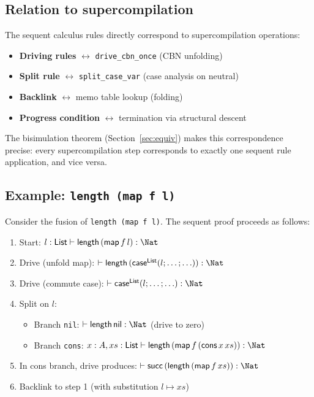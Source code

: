 \subsection{Relation to supercompilation}

The sequent calculus rules directly correspond to supercompilation operations:
\begin{itemize}
\item \textbf{Driving rules} $\leftrightarrow$ \texttt{drive\_cbn\_once} (CBN unfolding)
\item \textbf{Split rule} $\leftrightarrow$ \texttt{split\_case\_var} (case analysis on neutral)
\item \textbf{Backlink} $\leftrightarrow$ memo table lookup (folding)
\item \textbf{Progress condition} $\leftrightarrow$ termination via structural descent
\end{itemize}

\noindent The bisimulation theorem (Section~\ref{sec:equiv}) makes this correspondence precise: every supercompilation step corresponds to exactly one sequent rule application, and vice versa.

\subsection{Example: \texttt{length (map f l)}}

Consider the fusion of \texttt{length (map f l)}. The sequent proof proceeds as follows:

\begin{enumerate}
\item Start: $l : \mathsf{List} \vdash \mathsf{length}\,(\mathsf{map}\,f\,l) : \Nat$
\item Drive (unfold map): $\vdash \mathsf{length}\,(\Case{\mathsf{List}}{l}{\ldots}{\ldots}) : \Nat$
\item Drive (commute case): $\vdash \Case{\mathsf{List}}{l}{\ldots}{\ldots} : \Nat$
\item Split on $l$:
   \begin{itemize}
   \item Branch \texttt{nil}: $\vdash \mathsf{length}\,\mathsf{nil} : \Nat$ (drive to zero)
   \item Branch \texttt{cons}: $x : A, xs : \mathsf{List} \vdash \mathsf{length}\,(\mathsf{map}\,f\,(\mathsf{cons}\,x\,xs)) : \Nat$
   \end{itemize}
\item In cons branch, drive produces: $\vdash \mathsf{succ}\,(\mathsf{length}\,(\mathsf{map}\,f\,xs)) : \Nat$
\item Backlink to step 1 (with substitution $l \mapsto xs$)
\end{enumerate}

